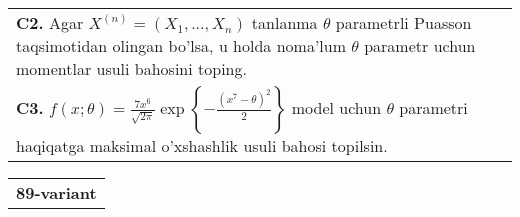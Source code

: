 \documentclass{article}
\begin{document}
\begin{tabular}{m{17cm}}
\\
\textbf{C2.} 
Agar \(X^{(n)} = \left( X_{1},...,X_{n} \right)\) tanlanma \(\theta\) parametrli Puasson taqsimotidan olingan bo'lsa, u holda noma'lum \(\theta\) parametr uchun momentlar usuli bahosini toping.
\\
\textbf{C3.} 
\(f(x;\theta) = \frac{7x^{6}}{\sqrt{2\pi}}\exp\left\{ - \frac{(x^{7} - \theta)^{2}}{2} \right\}\) model uchun \(\theta\) parametri haqiqatga maksimal o'xshashlik usuli bahosi topilsin.
\\

\end{tabular}
\vspace{1cm}


\begin{tabular}{m{17cm}}
\textbf{89-variant}
\newline


\end{tabular}
\end{document}

